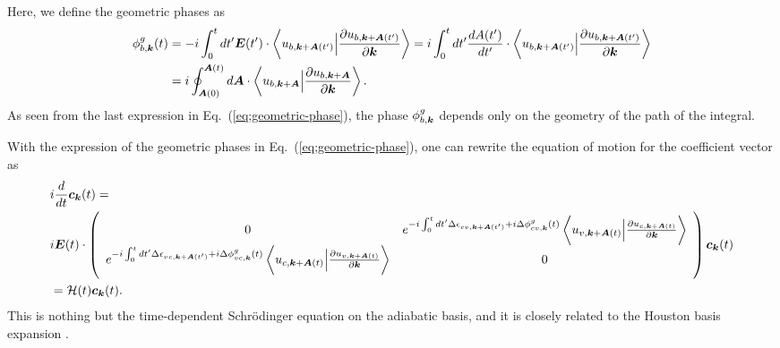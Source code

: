 Here, we define the geometric phases as
\begin{align}
\phi^g_{b,\boldsymbol k}(t) &= -i\int^t_0 dt' \boldsymbol E(t')\cdot 
\left \langle u_{b,\boldsymbol k+\boldsymbol A(t')}\Big |\frac{\partial u_{b,\boldsymbol k+\boldsymbol A(t')}}{\partial \boldsymbol k} \right \rangle
=i\int^t_0 dt' \frac{dA(t')}{dt'}\cdot 
\left \langle u_{b,\boldsymbol k+\boldsymbol A(t')}\Big |\frac{\partial u_{b,\boldsymbol k+\boldsymbol A(t')}}{\partial \boldsymbol k} \right \rangle \nonumber \\
&= i \oint^{\boldsymbol A(t)}_{\boldsymbol A(0)} d\boldsymbol A \cdot \left \langle u_{b,\boldsymbol k+\boldsymbol A}\Big |\frac{\partial u_{b,\boldsymbol k+\boldsymbol A}}{\partial \boldsymbol k} \right \rangle.
\label{eq;geometric-phase}
\end{align}
As seen from the last expression in Eq.~(\ref{eq;geometric-phase}), the phase $\phi^g_{b,\boldsymbol k}$ depends only on the geometry of the path of the integral.

With the expression of the geometric phases in Eq.~(\ref{eq;geometric-phase}), one can rewrite the equation of motion for the coefficient vector as
\begin{align}
&i\frac{d}{dt} \boldsymbol c_{\boldsymbol k}(t) = 
 \nonumber \\
& i\boldsymbol E(t)\cdot \left(
    \begin{array}{cc}
      0 & 
      e^{-i\int^t_0dt' \Delta \epsilon_{cv,\boldsymbol k+ \boldsymbol A(t')}+i \Delta \phi^g_{cv,\boldsymbol k}(t)} 
  \left \langle u_{v,\boldsymbol k+\boldsymbol A(t)}\Big |\frac{\partial u_{c,\boldsymbol k+\boldsymbol A(t)}}{\partial \boldsymbol k} \right \rangle \\
      e^{-i\int^t_0dt' \Delta \epsilon_{vc,\boldsymbol k+ \boldsymbol A(t')}+i \Delta \phi^g_{vc,\boldsymbol k}(t)} 
  \left \langle u_{c,\boldsymbol k+\boldsymbol A(t)}\Big |\frac{\partial u_{v,\boldsymbol k+\boldsymbol A(t)}}{\partial \boldsymbol k} \right \rangle &
      0
    \end{array}
    \right) \boldsymbol c_{\boldsymbol k}(t) \nonumber \\
&= \mathcal{H}(t) \boldsymbol c_{\boldsymbol k}(t)
.
\label{eq:tdse-ad-basis}
\end{align}
This is nothing but the time-dependent Schr\"odinger equation on the adiabatic basis, and it is closely related to the Houston basis expansion \cite{PhysRev.57.184,PhysRevB.33.5494}. 
